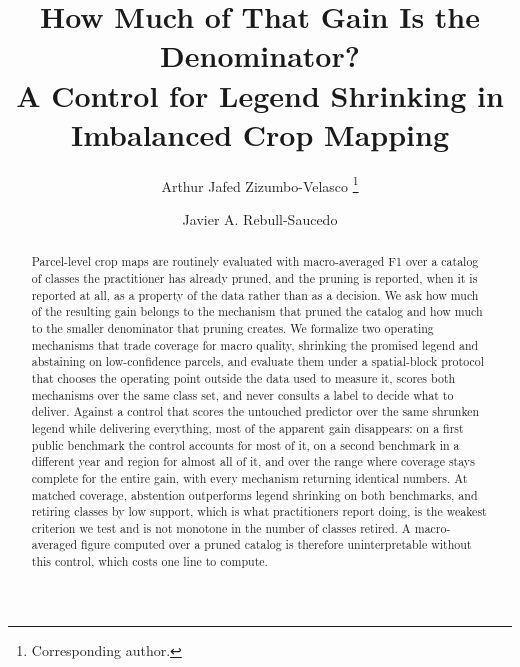 \documentclass[runningheads]{llncs}
\newif\ifanon
\begin{document}
\title{How Much of That Gain Is the Denominator?\texorpdfstring{\\}{ }A Control for Legend Shrinking in Imbalanced Crop Mapping}

\ifanon
  \author{Anonymous Author(s)}
  \institute{Anonymous Institution}
\else
  \author{%
    Arthur Jafed Zizumbo-Velasco%
    \thanks{Corresponding author.}
    \and
    Javier A. Rebull-Saucedo%
  }
\fi

\maketitle

\begin{abstract}
Parcel-level crop maps are routinely evaluated with macro-averaged F1 over a catalog of classes the
practitioner has already pruned, and the pruning is reported, when it is reported at all, as a
property of the data rather than as a decision. We ask how much of the resulting gain belongs to
the mechanism that pruned the catalog and how much to the smaller denominator that pruning
creates. We formalize two operating mechanisms that trade coverage for macro quality, shrinking the
promised legend and abstaining on low-confidence parcels, and evaluate them under a spatial-block
protocol that chooses the operating point outside the data used to measure it, scores both
mechanisms over the same class set, and never consults a label to decide what to deliver. Against a
control that scores the untouched predictor over the same shrunken legend while delivering
everything, most of the apparent gain disappears: on a first public benchmark the control accounts
for most of it, on a second benchmark in a different year and region for almost all of it, and over
the range where coverage stays complete for the entire gain, with every mechanism returning
identical numbers. At matched coverage, abstention outperforms legend shrinking on both benchmarks,
and retiring classes by low support, which is what practitioners report doing, is the weakest
criterion we test and is not monotone in the number of classes retired. A macro-averaged figure
computed over a pruned catalog is therefore uninterpretable without this control, which costs one
line to compute.

\end{abstract}
\end{document}
